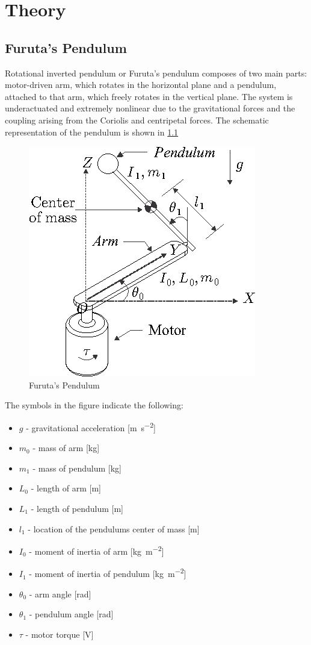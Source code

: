 \chapter{Theory}

\section{Furuta's Pendulum}

Rotational inverted pendulum or Furuta’s pendulum composes of two main parts: motor-driven arm, which rotates in the horizontal plane and a pendulum, attached to that arm, which freely rotates in the vertical plane. The system is underactuated and extremely nonlinear due to the gravitational forces and the coupling arising from the Coriolis and centripetal forces. The schematic representation of the pendulum is shown in \ref{furuta}
\begin{figure}[h]
	\centering
	\includegraphics[width=.6\linewidth]{images/furuta}
	\caption{Furuta's Pendulum}
	\label{furuta}
\end{figure}
\newpage
The symbols in the figure indicate the following:
\begin{itemize}
	\item \textbf{$g$} - gravitational acceleration [\si{\metre\per\square\second}]
	\item \textbf{$m_0$} - mass of arm [\si{\kilogram}]
	\item \textbf{$m_1$} - mass of pendulum [\si{\kilogram}]
	\item \textbf{$L_0$} - length of arm [\si{\metre}]
	\item \textbf{$L_1$} - length of pendulum [\si{\metre}]
	\item \textbf{$l_1$} - location of the pendulums center of mass [\si{\metre}]
	\item \textbf{$I_0$} - moment of inertia of arm [\si{\kilogram\per\square\metre}]
	\item \textbf{$I_1$} - moment of inertia of pendulum [\si{\kilogram\per\square\metre}]
	\item \textbf{$\theta_0$} - arm angle [\si{\radian}]
	\item \textbf{$\theta_1$} - pendulum angle [\si{\radian}]
	\item \textbf{$\tau$} - motor torque [\si{\volt}]
\end{itemize}
